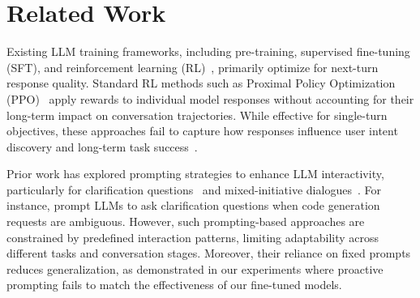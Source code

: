 
\section{Related Work}
\label{app:related}


Existing LLM training frameworks, including pre-training, supervised fine-tuning (SFT), and reinforcement learning (RL)~\citep{dpo, ppo, rlhf, rlaif}, primarily optimize for next-turn response quality. Standard RL methods such as Proximal Policy Optimization (PPO)~\citep{ppo} apply rewards to individual model responses without accounting for their long-term impact on conversation trajectories. While effective for single-turn objectives, these approaches fail to capture how responses influence user intent discovery and long-term task success~\cite{guidelines, johnny,understand_user_experience,dissatisfaction,proactive_agent}.

Prior work has explored prompting strategies to enhance LLM interactivity, particularly for clarification questions~\citep{ask_more_informative_questions, clarifygpt, clarify_when_necessary, clarinet, tree_of_clarifications, rephrase_and_respond, multiturn_clarification} and mixed-initiative dialogues~\citep{proactive_cot, mixed_initiative_dialogue, proactive_agents}. For instance, \citet{clarifygpt} prompt LLMs to ask clarification questions when code generation requests are ambiguous. However, such prompting-based approaches are constrained by predefined interaction patterns, limiting adaptability across different tasks and conversation stages. Moreover, their reliance on fixed prompts reduces generalization, as demonstrated in our experiments where proactive prompting fails to match the effectiveness of our fine-tuned models.

